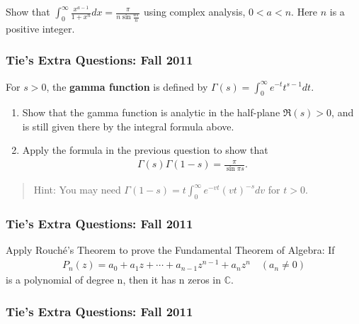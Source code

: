 Show that
\(\displaystyle \int_0^\infty \frac{x^{a-1}}{1+x^n} dx=\frac{\pi}{n\sin \frac{a\pi}{n}}\)
using complex analysis, \(0< a < n\). Here \(n\) is a positive integer.

\hypertarget{ties-extra-questions-fall-2011-5}{%
\subsubsection{Tie's Extra Questions: Fall
2011}\label{ties-extra-questions-fall-2011-5}}

For \(s>0\), the \textbf{gamma function} is defined by
\(\displaystyle{\Gamma(s)=\int_0^{\infty} e^{-t}t^{s-1} dt}\).

\begin{enumerate}
\def\labelenumi{\arabic{enumi}.}
\item
  Show that the gamma function is analytic in the half-plane
  \(\Re (s)>0\), and is still given there by the integral formula above.
\item
  Apply the formula in the previous question to show that
  \begin{align*}\Gamma(s)\Gamma(1-s)=\frac{\pi}{\sin \pi s}.\end{align*}
\end{enumerate}

\begin{quote}
Hint: You may need
\(\displaystyle{\Gamma(1-s)=t \int_0^{\infty}e^{-vt}(vt)^{-s} dv}\) for
\(t>0\).
\end{quote}

\hypertarget{ties-extra-questions-fall-2011-6}{%
\subsubsection{Tie's Extra Questions: Fall
2011}\label{ties-extra-questions-fall-2011-6}}

Apply Rouché's Theorem to prove the Fundamental Theorem of Algebra: If
\begin{align*}P_n(z) = a_0 + a_1z + \cdots + a_{n-1}z^{n-1} + a_nz^n\quad  (a_n \neq 0)\end{align*}
is a polynomial of degree n, then it has n zeros in \(\mathbb C\).

\hypertarget{ties-extra-questions-fall-2011-7}{%
\subsubsection{Tie's Extra Questions: Fall
2011}\label{ties-extra-questions-fall-2011-7}}

